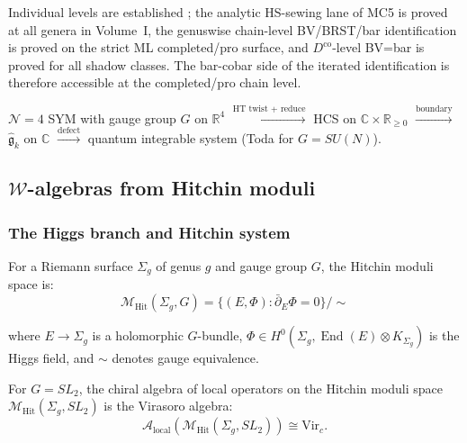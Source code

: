 \begin{remark}
Individual levels are established \cite{BD04,CG17,CWY18}; the analytic HS-sewing lane of MC5 is proved at all genera in Volume~I, the genuswise chain-level BV/BRST/bar identification is proved on the strict ML completed/pro surface, and $D^{\mathrm{co}}$-level BV=bar is proved for all shadow classes. The bar-cobar side of the iterated identification is therefore accessible at the completed/pro chain level.
\end{remark}

\begin{example}[Explicit tower for \texorpdfstring{$\mathcal{N}=4$}{N=4} SYM]
$\mathcal{N}=4$ SYM with gauge group $G$ on $\mathbb{R}^4$
$\xrightarrow{\text{HT twist + reduce}}$
HCS on $\mathbb{C} \times \mathbb{R}_{\geq 0}$
$\xrightarrow{\text{boundary}}$
$\widehat{\mathfrak{g}}_k$ on $\mathbb{C}$
$\xrightarrow{\text{defect}}$
quantum integrable system (Toda for $G = SU(N)$).
\end{example}

\subsection{$\mathcal{W}$-algebras from Hitchin moduli}

\subsubsection{The Higgs branch and Hitchin system}

\begin{definition}
For a Riemann surface $\Sigma_g$ of genus $g$ and gauge group $G$, the Hitchin
moduli space is:
\[\mathcal{M}_{\text{Hit}}(\Sigma_g, G) = \{(E, \Phi) : \bar{\partial}_E \Phi = 0\} /
\sim\]

where $E \to \Sigma_g$ is a holomorphic $G$-bundle, $\Phi \in H^0(\Sigma_g, \operatorname{End}(E) \otimes K_{\Sigma_g})$ is the Higgs field, and $\sim$ denotes gauge equivalence.
\end{definition}

\begin{proposition}\label{prop:virasoro-from-hitchin}
For $G = SL_2$, the chiral algebra of local operators on the Hitchin moduli space $\mathcal{M}_{\mathrm{Hit}}(\Sigma_g, SL_2)$ is the Virasoro algebra:
\[\mathcal{A}_{\mathrm{local}}(\mathcal{M}_{\mathrm{Hit}}(\Sigma_g, SL_2)) \cong \mathrm{Vir}_c.\]
\end{proposition}

